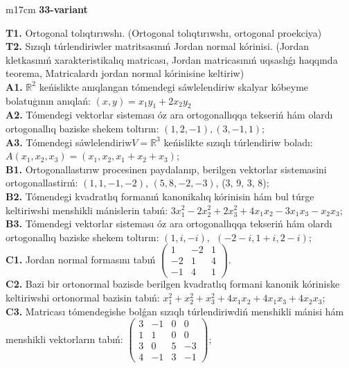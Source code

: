 \documentclass{article}
\begin{document}
\begin{tabular}{m{17cm}}
\textbf{33-variant}
\newline

\textbf{T1.} Ortogonal  tolıqtırıwshı. (Ortogonal tolıqtırıwshı,  ortogonal proekciya) \\
\textbf{T2.} Sızıqlı túrlendiriwler matritsasınıń Jordan normal kórinisi. (Jordan kletkasınıń xarakteristikalıq matricası, Jordan matricasınıń uqsaslıǵı haqqında teorema,  Matricalardı jordan normal kórinisine keltiriw) \\
\textbf{A1.} \(\mathbb{R}^{2}\) keńislikte anıqlangan tómendegi sáwlelendiriw skalyar kóbeyme bolatuģının anıqlań: \((x,y) = x_{1}y_{1} + 2x_{2}y_{2}\) \\
\textbf{A2.} Tómendegi vektorlar sisteması óz ara ortogonallıqqa tekseriń hám olardı ortogonallıq baziske shekem toltırın: \((1,2, - 1),(3, - 1,1)\); \\
\textbf{A3.} Tómendegi sáwlelendiriw\(V = \mathbb{R}^{3}\) keńislikte sızıqlı túrlendiriw boladı: \(A\left( x_{1},x_{2},x_{3} \right) = \left( x_{1},x_{2},x_{1} + x_{2} + x_{3} \right)\); \\
\textbf{B1.} Ortogonallastırıw procesinen paydalanıp, berilgen vektorlar sistemasini ortogonallastirıń: \((1,1, - 1, - 2)\), \((5,8, - 2, - 3)\), (3, 9, 3, 8); \\
\textbf{B2.} Tómendegi kvadratlıq formanıń kanonikalıq kórinisin hám bul túrge keltiriwshi menshikli mánislerin tabıń: \(3x_{1}^{2} - 2x_{2}^{2} + 2x_{3}^{2} + 4x_{1}x_{2} - 3x_{1}x_{3} - x_{2}x_{3}\); \\
\textbf{B3.} Tómendegi vektorlar sisteması óz ara ortogonallıqqa tekseriń hám olardı ortogonallıq baziske shekem toltırın: \((1,i, - i),\ \ ( - 2 - i,1 + i,2 - i)\); \\
\textbf{C1.} Jordan normal formasını tabıń \(\begin{pmatrix} 1 & - 2 & 1 \\  - 2 & 1 & 4 \\  - 1 & 4 & 1 \end{pmatrix}\). \\
\textbf{C2.} Bazi bir ortonormal bazisde berilgen kvadratlıq formani kanonik kóriniske keltiriwshi ortonormal bazisin tabıń: \(x_{1}^{2} + x_{2}^{2} + x_{3}^{2} + 4x_{1}x_{2} + 4x_{1}x_{3} + 4x_{2}x_{3}\); \\
\textbf{C3.} Matricası tómendegishe bolǵan sızıqlı túrlendiriwdiń menshikli mánisi hám menshikli vektorların tabıń: \(\begin{pmatrix} 3 & - 1 & 0 & 0 \\ 1 & 1 & 0 & 0 \\ 3 & 0 & 5 & - 3 \\ 4 & - 1 & 3 & - 1 \end{pmatrix}\); \\

\end{tabular}
\vspace{1cm}
\end{document}
